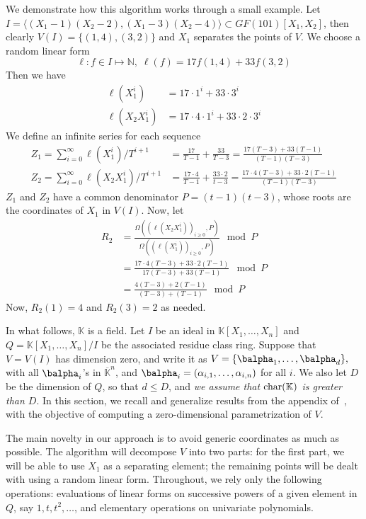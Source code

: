 \documentclass[12pt]{article}
\def\K{\mathbb{K}}
\def\K {\ensuremath{\mathbb{K}}}
\def\Kbar {{\ensuremath{\overline{\mathbb{K}}}}}
\def\D {\ensuremath{D}}
\begin{document}
We demonstrate how this algorithm works through a small example. Let 
$I = \langle (X_1-1)(X_2-2),(X_1-3)(X_2-4)\rangle \subset
GF(101)[X_1,X_2]$, then
clearly $V(I) = \{ (1,4),(3,2) \}$ and $X_1$ separates the
points of $V$. We choose a random linear form 
$$\ell: f \in I \mapsto \mathbb{N},\;\ell(f) = 17 f(1,4) + 33 f(3,2)$$
Then we have
\begin{align*}
\ell(X_1^i) &= 17 \cdot 1^i + 33 \cdot 3^i\\
\ell(X_2X_1^i) &= 17 \cdot 4 \cdot 1^i + 33 \cdot 2 \cdot 3^i
\end{align*} 
We define an infinite series for each sequence
\begin{align*}
Z_1 = \sum_{i = 0}^{\infty} \ell(X^i_1) / T^{i+1}
&= \frac{17}{T-1} + \frac{33}{T-3}
= \frac{17(T-3)+33(T-1)}{(T-1)(T-3)} \\
Z_2 = \sum_{i=0}^{\infty} \ell(X_2X^i_1)/T^{i+1} 
&= \frac{17\cdot 4}{T-1} + \frac{33 \cdot 2}{t-3}
= \frac{17\cdot 4 (T-3) + 33\cdot 2(T-1)}{(T-1)(T-3)}
\end{align*}
$Z_1$ and $Z_2$ have a common denominator $P = (t-1)(t-3)$,
whose roots are the coordinates of $X_1$ in $V(I)$. Now, let
\begin{align*}
R_2 
&=\frac{\Omega((\ell(X_2X^i_1))_{i\ge 0},P)}{\Omega((\ell(X^i_1))_{i\ge 0},P)} \mod P\\
&= 
\frac{17\cdot 4 (T-3) + 33\cdot 2(T-1)}{17(T-3)+33(T-1)} \mod P\\
&=\frac{4 (T-3) + 2(T-1)}{(T-3)+(T-1)} \mod P
\end{align*}
Now, $ R_2(1) = 4$ and $R_2(3) = 2$ as needed.






In what follows, $\K$ is a field.  Let $I$ be an ideal in
$\K[X_1,\dots,X_n]$ and $Q=\K[X_1,\dots,X_n]/I$ be the associated
residue class ring. Suppose that $V=V(I)$ has dimension zero, and
write it as $V=\{\balpha_1,\dots,\balpha_d\},$ with all $\balpha_i$'s
in $\Kbar^n$, and $\balpha_i=(\alpha_{i,1},\dots,\alpha_{i,n})$ for
all $i$.  We also let $\D$ be the dimension of $Q$, so that $d \le
\D$, and {\em we assume that ${\rm char}(\K)$ is greater than $D$}. In
this section, we recall and generalize results from the appendix
of~\cite{BoSaSc03}, with the objective of computing a zero-dimensional
parametrization of $V$.

The main novelty in our approach is to avoid generic coordinates as
much as possible. The algorithm will decompose $V$ into two parts: for
the first part, we will be able to use $X_1$ as a separating element;
the remaining points will be dealt with using a random linear
form. Throughout, we rely only the following operations: evaluations
of linear forms on successive powers of a given element in $Q$, say
$1,t,t^2,\dots$, and elementary operations on univariate polynomials.
\end{document}

